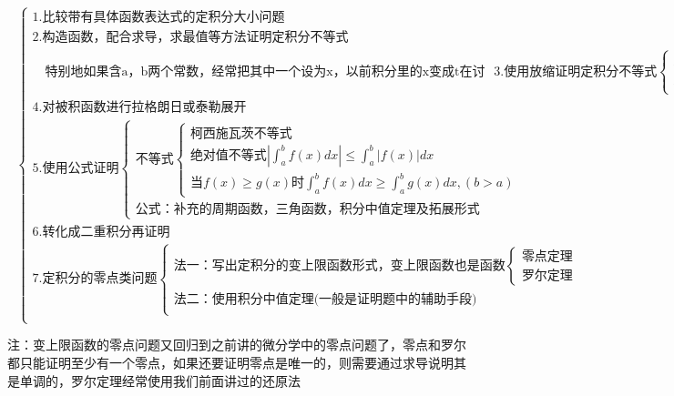 \documentclass[a4paper,11pt]{book}
\begin{document}
\[
\text{\ }    
\begin{cases}
    \text{1.比较带有具体函数表达式的定积分大小问题}\\
    \text{2.构造函数，配合求导，求最值等方法证明定积分不等式}\\
    \quad \text{特别地如果含a，b两个常数，经常把其中一个设为x，以前积分里的x变成t在讨论}
    \text{3.使用放缩证明定积分不等式}
        \begin{cases}
            \text{放缩被积函数}\\
            \text{放缩被积分区间(一般是缩小)}\\
        \end{cases}\\
    \text{4.对被积函数进行拉格朗日或泰勒展开}\\
    \text{5.使用公式证明}
        \begin{cases}
            \text{不等式}
                \begin{cases}
                    \text{柯西施瓦茨不等式}\\
                    \text{绝对值不等式}\left|\int_{a}^{b} f(x) d x\right| \le \int_{a}^{b}|f(x)| d x\\
                    \text{当} f(x)\ge g(x) \text{时}\int_{a}^{b} f(x) d x \geq \int_{a}^{b} g(x) d x,(b>a)
                \end{cases}\\
            \text{公式：补充的周期函数，三角函数，积分中值定理及拓展形式}
        \end{cases}\\
    \text{6.转化成二重积分再证明}\\
    \text{7.定积分的零点类问题}
        \begin{cases}
            \text{法一：写出定积分的变上限函数形式，变上限函数也是函数}
                \begin{cases}
                    \text{零点定理}\\
                    \text{罗尔定理}
                \end{cases}\\
            \text{法二：使用积分中值定理(一般是证明题中的辅助手段)}\\
        \end{cases}\\
\end{cases}
\]


注：变上限函数的零点问题又回归到之前讲的微分学中的零点问题了，零点和罗尔都只能证明至少有一个零点，如果还要证明零点是唯一的，则需要通过求导说明其是单调的，罗尔定理经常使用我们前面讲过的还原法
\end{document}

